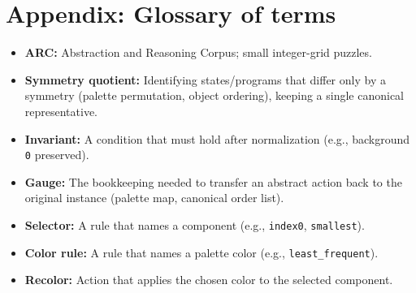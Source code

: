 \documentclass[11pt]{article}
\newcommand{\code}[1]{\texttt{#1}}
\begin{document}
\section*{Appendix: Glossary of terms}

\begin{itemize}
\item \textbf{ARC:} Abstraction and Reasoning Corpus; small integer-grid puzzles.
\item \textbf{Symmetry quotient:} Identifying states/programs that differ only by a symmetry (palette permutation, object ordering), keeping a single canonical representative.
\item \textbf{Invariant:} A condition that must hold after normalization (e.g., background \code{0} preserved).
\item \textbf{Gauge:} The bookkeeping needed to transfer an abstract action back to the original instance (palette map, canonical order list).
\item \textbf{Selector:} A rule that names a component (e.g., \code{index0}, \code{smallest}).
\item \textbf{Color rule:} A rule that names a palette color (e.g., \code{least\_frequent}).
\item \textbf{Recolor:} Action that applies the chosen color to the selected component.
\end{itemize}
\end{document}
